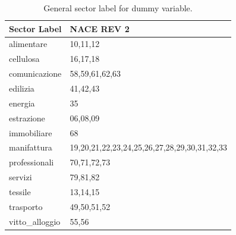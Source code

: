 \begin{table}[H]

\caption{\label{tab:table:gensectlable}General sector label for dummy variable.}
\centering
\begin{tabular}[t]{ll}
\toprule
Sector Label & NACE REV 2\\
\midrule
alimentare & 10,11,12\\
\addlinespace
cellulosa & 16,17,18\\
\addlinespace
comunicazione & 58,59,61,62,63\\
\addlinespace
edilizia & 41,42,43\\
\addlinespace
energia & 35\\
\addlinespace
estrazione & 06,08,09\\
\addlinespace
immobiliare & 68\\
\addlinespace
manifattura & 19,20,21,22,23,24,25,26,27,28,29,30,31,32,33\\
\addlinespace
professionali & 70,71,72,73\\
\addlinespace
servizi & 79,81,82\\
\addlinespace
tessile & 13,14,15\\
\addlinespace
trasporto & 49,50,51,52\\
\addlinespace
vitto\_alloggio & 55,56\\
\bottomrule
\end{tabular}
\end{table}